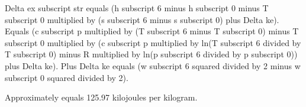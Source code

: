 Delta ex subscript str equals (h subscript 6 minus h subscript 0 minus T subscript 0 multiplied by (s subscript 6 minus s subscript 0) plus Delta ke).  
Equals (c subscript p multiplied by (T subscript 6 minus T subscript 0) minus T subscript 0 multiplied by (c subscript p multiplied by ln(T subscript 6 divided by T subscript 0) minus R multiplied by ln(p subscript 6 divided by p subscript 0)) plus Delta ke).  
Plus Delta ke equals (w subscript 6 squared divided by 2 minus w subscript 0 squared divided by 2).  

Approximately equals 125.97 kilojoules per kilogram.